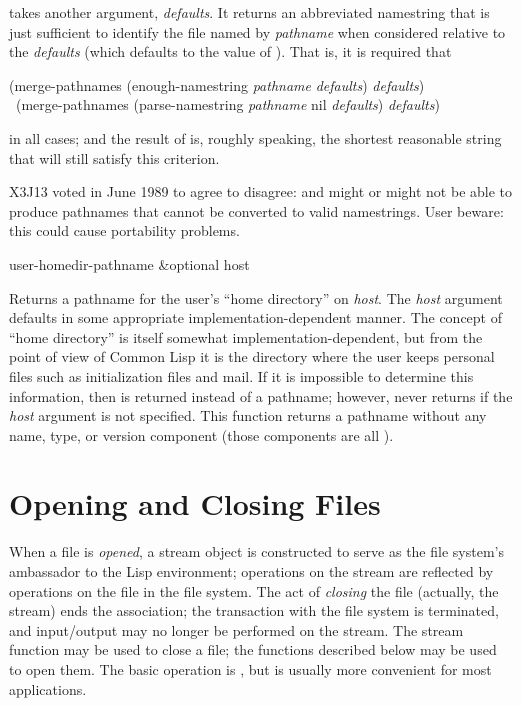 \begin{defun}[Function]
 takes another argument, {\it defaults}.
It returns an abbreviated namestring that is just sufficient to
identify the file named by {\it pathname} when considered relative
to the {\it defaults} (which defaults to the value of
).  That is, it is required
that
\begin{lisp}
(merge-pathnames (enough-namestring {\it pathname} {\it defaults}) {\it defaults}) {\EQ} \\
~(merge-pathnames (parse-namestring {\it pathname} nil {\it defaults}) {\it defaults})
\end{lisp}
in all cases; and the result of  is, roughly speaking,
the shortest reasonable string that will still satisfy this criterion.
\begin{newer}
X3J13 voted in June 1989  to agree to disagree:
 and  might or might not be able to produce pathnames
that cannot be converted to valid namestrings.
User beware: this could cause portability problems.
\end{newer}
\end{defun}

\begin{defun}[Function]
user-homedir-pathname &optional host

Returns a pathname for the user's ``home directory'' on {\it host}.
The {\it host} argument
defaults in some appropriate implementation-dependent manner.  The
concept of ``home directory'' is itself somewhat
implementation-dependent, but from the point of view of Common Lisp it is the
directory where the user keeps personal files such as initialization
files and mail.  If it is impossible to determine this information,
then {\nil} is returned instead of a pathname; however,
 never returns {\nil} if the {\it host} argument
is not specified.
This function returns a pathname without any name, type,
or version component (those components are all {\nil}).
\end{defun}


\section{Opening and Closing Files}

When a file is {\it opened}, a stream object is constructed to serve
as the file system's ambassador to the Lisp environment;
operations on the stream are reflected by operations on the file
in the file system.  The act of {\it closing} the file (actually,
the stream) ends the association; the transaction with the file
system is terminated, and input/output may no longer be performed
on the stream.  The stream function  may be used
to close a file; the functions described below may be used to open them.
The basic operation is , but  is usually
more convenient for most applications.

